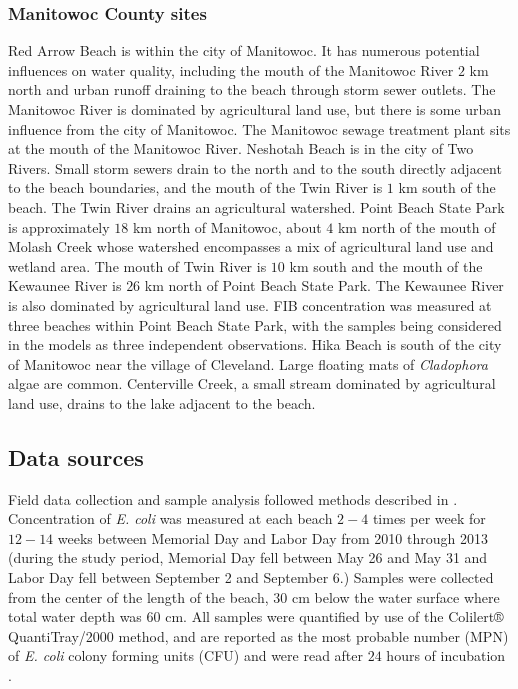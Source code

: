 \documentclass[authoryear,review, 12pt]{elsarticle}
\begin{document}
\subsubsection{Manitowoc County sites}\label{manitowoc-county-sites}

Red Arrow Beach is within the city of Manitowoc. It has numerous
potential influences on water quality, including the mouth of the
Manitowoc River \(2\) km north and urban runoff draining to the beach
through storm sewer outlets. The Manitowoc River is dominated by
agricultural land use, but there is some urban influence from the city
of Manitowoc. The Manitowoc sewage treatment plant sits at the mouth of
the Manitowoc River. Neshotah Beach is in the city of Two
Rivers. Small storm sewers drain to the north and to the south directly
adjacent to the beach boundaries, and the mouth of the Twin River is
\(1\) km south of the beach. The Twin River drains an agricultural
watershed. Point Beach State Park is approximately \(18\) km north of
Manitowoc, about \(4\) km north of the mouth of Molash Creek whose
watershed encompasses a mix of agricultural land use and wetland area.
The mouth of Twin River is \(10\) km south and the mouth of the Kewaunee
River is \(26\) km north of Point Beach State Park. The Kewaunee River
is also dominated by agricultural land use. FIB concentration was
measured at three beaches within Point Beach State Park, with the
samples being considered in the models as three independent
observations. Hika Beach is south of the city of Manitowoc near the
village of Cleveland. Large floating mats of \emph{Cladophora}
algae are common. Centerville Creek, a small stream dominated by
agricultural land use, drains to the lake adjacent to the beach.

\subsection{Data sources}\label{data-sources}

Field data collection and sample analysis followed methods described in
\cite{Francy-et-al-2013}. Concentration of \emph{E. coli} was measured at each
beach \(2-4\) times per week for \(12-14\) weeks between Memorial Day 
and Labor Day from 2010 through 2013 (during the study period, Memorial Day fell between May 26 and May 31 and Labor Day fell between September 2 and September 6.) Samples were collected from the 
center of the length of the beach, \(30\) cm below the water surface
where total water depth was \(60\) cm. All samples were quantified by
use of the Colilert® QuantiTray/2000 method, and are reported as the
most probable number (MPN) of \emph{E. coli} colony forming units (CFU)
and were read after \(24\) hours of incubation \citep{Colilert}.
\end{document}
